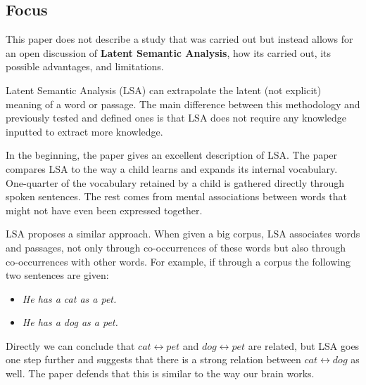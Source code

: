 \documentclass{Paper_Summary}
\begin{document}
\makepapertitle

\breakline

\begin{center}
    \section*{Focus}
\end{center}
    
    This paper does not describe a study that was carried out but instead allows for an open discussion of \textbf{Latent Semantic Analysis}, how its carried out, its possible advantages, and limitations.

    Latent Semantic Analysis (LSA) can extrapolate the latent (not explicit) meaning of a word or passage. The main difference between this methodology and previously tested and defined ones is that LSA does not require any knowledge inputted to extract more knowledge.

    In the beginning, the paper gives an excellent description of LSA. The paper compares LSA to the way a child learns and expands its internal vocabulary. One-quarter of the vocabulary retained by a child is gathered directly through spoken sentences. The rest comes from mental associations between words that might not have even been expressed together.

    LSA proposes a similar approach. When given a big corpus, LSA associates words and passages, not only through co-occurrences of these words but also through co-occurrences with other words. For example, if through a corpus the following two sentences are given:
    \begin{itemize}
        \item \emph{He has a cat as a pet.}
        \item \emph{He has a dog as a pet.}
    \end{itemize}
    Directly we can conclude that \(cat \leftrightarrow pet\) and \(dog \leftrightarrow pet\) are related, but LSA goes one step further and suggests that there is a strong relation between \(cat \leftrightarrow dog\) as well. The paper defends that this is similar to the way our brain works.
\end{document}
